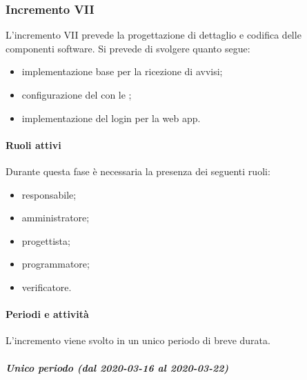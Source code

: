 
		\subsubsection{Incremento VII}
			
			L'incremento VII prevede la progettazione di dettaglio e codifica delle componenti software. Si prevede di svolgere quanto segue:
			\begin{itemize}
				\item implementazione base  per la ricezione di avvisi;
				\item configurazione del  con le ;
				\item implementazione del login per la web app.
			\end{itemize}
			
			\paragraph{Ruoli attivi}
			
				Durante questa fase è necessaria la presenza dei seguenti ruoli:
				\begin{itemize}
					\item responsabile;
					\item amministratore;
					\item progettista;
					\item programmatore;
					\item verificatore.
				\end{itemize}
			
			\paragraph{Periodi e attività}
			
				L'incremento viene svolto in un unico periodo di breve durata.
				
				\subparagraph{Unico periodo (dal 2020-03-16 al 2020-03-22)}
				
